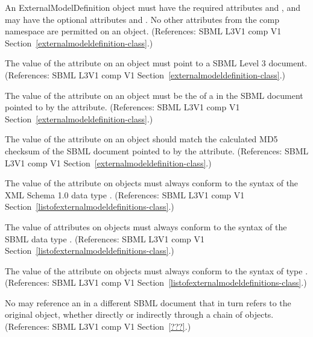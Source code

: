 \begin{sbmlenum}
 { An ExternalModelDefinition object must have the
  required attributes  and , and may have
  the optional attributes  and .
  No other attributes from the comp namespace are permitted on an
  \ExternalModelDefinition object.
  (References: SBML L3V1 comp V1 Section~\ref{externalmodeldefinition-class}.) }


 { The value of the  attribute on an
  \ExternalModelDefinition object must point to a SBML Level 3 document.
  (References: SBML L3V1 comp V1 Section~\ref{externalmodeldefinition-class}.) }


 { The value of the  attribute on an
  \ExternalModelDefinition object must be the  of a \Model
  in the SBML document pointed to by the  attribute.
  (References: SBML L3V1 comp V1 Section~\ref{externalmodeldefinition-class}.) }


 { The value of the  attribute on an
  \ExternalModelDefinition object should match the
  calculated MD5 checksum of the SBML document pointed to by the 
   attribute.
  (References: SBML L3V1 comp V1 Section~\ref{externalmodeldefinition-class}.) }


 { The value of the  attribute on
  \ExternalModelDefinition objects must always conform to the syntax of
  the XML Schema 1.0 data type .
  (References: SBML L3V1 comp V1 
  Section~\ref{listofexternalmodeldefinitions-class}.) }


 { The value of  attributes on
  \ExternalModelDefinition objects must always conform to the syntax of
  the SBML data type .
  (References: SBML L3V1 comp V1 
  Section~\ref{listofexternalmodeldefinitions-class}.) }


 { The value of the  attribute on
  \ExternalModelDefinition objects must always conform to the syntax of
  type .
  (References: SBML L3V1 comp V1 
  Section~\ref{listofexternalmodeldefinitions-class}.) }

 { No \ExternalModelDefinition may reference an
  \ExternalModelDefinition in a different SBML document that in turn
  refers to the original \ExternalModelDefinition object, whether
  directly or indirectly through a chain of \ExternalModelDefinition
  objects.
  (References: SBML L3V1 comp V1 Section~\ref{???}.) }


\end{sbmlenum}
